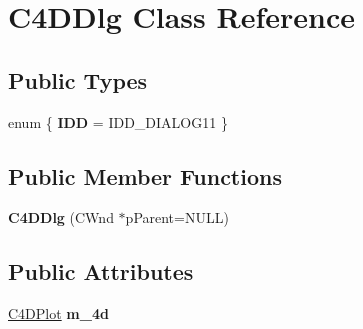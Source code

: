 \hypertarget{class_c4_d_dlg}{\section{C4\-D\-Dlg Class Reference}
\label{class_c4_d_dlg}
}
\subsection*{Public Types}
\begin{DoxyCompactItemize}
\item 
enum \{ {\bfseries I\-D\-D} =  I\-D\-D\-\_\-\-D\-I\-A\-L\-O\-G11
 \}
\end{DoxyCompactItemize}
\subsection*{Public Member Functions}
\begin{DoxyCompactItemize}
\item 
\hypertarget{class_c4_d_dlg_a728f7217a00df91b2d73a92dece4ef74}{{\bfseries C4\-D\-Dlg} (C\-Wnd $\ast$p\-Parent=N\-U\-L\-L)}\label{class_c4_d_dlg_a728f7217a00df91b2d73a92dece4ef74}

\end{DoxyCompactItemize}
\subsection*{Public Attributes}
\begin{DoxyCompactItemize}
\item 
\hypertarget{class_c4_d_dlg_ae75f690876f4f46ab143c22bdf96d0fc}{\hyperlink{class_c4_d_plot}{C4\-D\-Plot} {\bfseries m\-\_\-4d}}\label{class_c4_d_dlg_ae75f690876f4f46ab143c22bdf96d0fc}

\end{DoxyCompactItemize}

